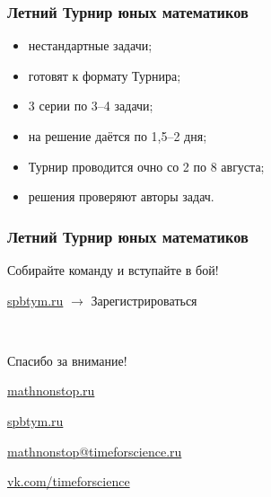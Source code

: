\documentclass[aspectratio=1610,12pt,notheorems]{beamer}
\begin{document}
\begin{frame} \frametitle{Летний Турнир юных математиков}
\begin{itemize}
	\item нестандартные задачи;
	\item готовят к формату Турнира;
	\item 3 серии по 3--4 задачи;
	\item на решение даётся по 1,5--2 дня;
	\item Турнир проводится очно со 2 по 8 августа;
	\item решения проверяют авторы задач.
\end{itemize}
\end{frame}

\begin{frame} \frametitle{Летний Турнир юных математиков}
\begin{center}
\vspace{-10mm}
Собирайте команду и вступайте в бой!\vspace{3mm}

		\vspace{3mm}
		
		\url{spbtym.ru} $\rightarrow$ Зарегистрироваться
\end{center}
\end{frame}

\begin{frame} \begin{center}
\ 

	{\Large Спасибо за внимание!} \vspace{0.4cm}

	{\large \url{mathnonstop.ru}}

	{\large \url{spbtym.ru}}

	{\large \url{mathnonstop@timeforscience.ru}}

	{\large \url{vk.com/timeforscience}}
\end{center} \end{frame}
\end{document}
